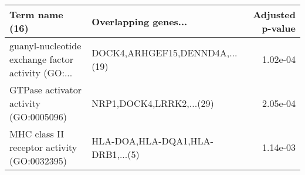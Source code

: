 \begin{tabular}{llr}
\toprule
                                    Term name (16) &             Overlapping genes... &  Adjusted p-value \\
\midrule
guanyl-nucleotide exchange factor activity (GO:... &   DOCK4,ARHGEF15,DENND4A,...(19) &          1.02e-04 \\
            GTPase activator activity (GO:0005096) &         NRP1,DOCK4,LRRK2,...(29) &          2.05e-04 \\
       MHC class II receptor activity (GO:0032395) & HLA-DOA,HLA-DQA1,HLA-DRB1,...(5) &          1.14e-03 \\
\bottomrule
\end{tabular}
